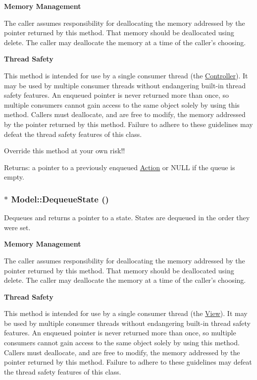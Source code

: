 {\bf Memory Management} 

The caller assumes responsibility for deallocating the memory addressed by the pointer returned by this method. That memory should be deallocated using delete. The caller may deallocate the memory at a time of the caller's choosing. 

{\bf Thread Safety} 

This method is intended for use by a single consumer thread (the \hyperlink{classController}{Controller}). It may be used by multiple consumer threads without endangering built-in thread safety features. An enqueued pointer is never returned more than once, so multiple consumers cannot gain access to the same object solely by using this method. Callers must deallocate, and are free to modify, the memory addressed by the pointer returned by this method. Failure to adhere to these guidelines may defeat the thread safety features of this class. 

Override this method at your own risk!!  \begin{Desc}
\item[Returns:]a pointer to a previously enqueued \hyperlink{classAction}{Action} or NULL if the queue is empty. \end{Desc}
\hypertarget{classModel_a92abd0332df9f768033423b0cd8b3ae}{
\subsubsection[{DequeueState}]{ $\ast$ Model::DequeueState ()}}
\label{classModel_a92abd0332df9f768033423b0cd8b3ae}


Dequeues and returns a pointer to a state. States are dequeued in the order they were set. 

{\bf Memory Management} 

The caller assumes responsibility for deallocating the memory addressed by the pointer returned by this method. That memory should be deallocated using delete. The caller may deallocate the memory at a time of the caller's choosing. 

{\bf Thread Safety} 

This method is intended for use by a single consumer thread (the \hyperlink{classView}{View}). It may be used by multiple consumer threads without endangering built-in thread safety features. An enqueued pointer is never returned more than once, so multiple consumers cannot gain access to the same object solely by using this method. Callers must deallocate, and are free to modify, the memory addressed by the pointer returned by this method. Failure to adhere to these guidelines may defeat the thread safety features of this class. 

